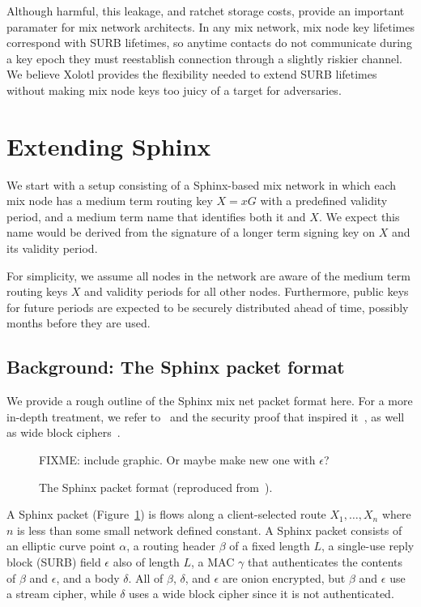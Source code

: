 \documentclass[twoside,letterpaper]{llncs}
\begin{document}
Although harmful, this leakage, and ratchet storage costs, provide an
important paramater for mix network architects.  In any mix network,
mix node key lifetimes correspond with SURB lifetimes, so anytime
contacts do not communicate during a key epoch they must reestablish
connection through a slightly riskier channel.  We believe Xolotl
provides the flexibility needed to extend SURB lifetimes without
making mix node keys too juicy of a target for adversaries.


\section{Extending Sphinx}

We start with a setup consisting of a Sphinx-based mix network in
which each mix node has a medium term routing key $X = x G$ with a
predefined validity period, and a medium term name that identifies
both it and $X$.  We expect this name would be derived from the
signature of a longer term signing key on $X$ and its validity period.

For simplicity, we assume all nodes in the network are aware of the
medium term routing keys $X$ and validity periods for all other nodes.
Furthermore, public keys for future periods are expected to be
securely distributed ahead of time, possibly months before they are
used.


\subsection{Background: The Sphinx packet format}

We provide a rough outline of the Sphinx mix net packet format here.
For a more in-depth treatment, we refer to~\cite{Sphinx} and the
security proof that inspired it~\cite{FormalOnion}, as well as wide
block ciphers~\cite{Lionness}.

\begin{figure}
  \begin{center}
     FIXME: include graphic. Or maybe make new one with $\epsilon$?
  \end{center}
  \caption{The Sphinx packet format (reproduced from~\cite{Sphinx}).}
  \label{fig:sphinx}
\end{figure}

A Sphinx packet (Figure~\ref{fig:sphinx}) is flows along a client-selected route $X_1,\ldots,X_n$
where $n$ is less than some small network defined constant.  A Sphinx
packet consists of an elliptic curve point $\alpha$, a routing header
$\beta$ of a fixed length $L$, a single-use reply block (SURB) field
$\epsilon$ also of length $L$, a MAC $\gamma$ that authenticates the
contents of $\beta$ and $\epsilon$, and a body $\delta$.  All of
$\beta$, $\delta$, and $\epsilon$ are onion encrypted, but $\beta$ and
$\epsilon$ use a stream cipher, while $\delta$ uses a wide block
cipher since it is not authenticated.
\end{document}
